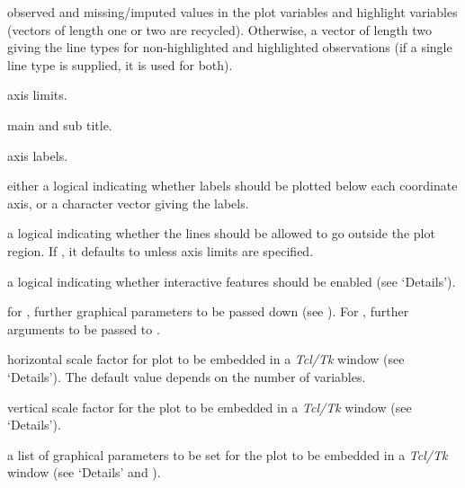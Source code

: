 \begin{Arguments}
\begin{ldescription}
observed and missing/imputed values in the plot variables and highlight variables 
(vectors of length one or two are recycled).  Otherwise, a vector of length 
two giving the line types for non-highlighted and highlighted observations 
(if a single line type is supplied, it is used for both).
\item[\code{xlim, ylim}] axis limits.
\item[\code{main, sub}] main and sub title.
\item[\code{xlab, ylab}] axis labels.
\item[\code{labels}] either a logical indicating whether labels should be plotted 
below each coordinate axis, or a character vector giving the labels.
\item[\code{xpd}] a logical indicating whether the lines should be allowed to go 
outside the plot region.  If , it defaults to  unless 
axis limits are specified.
\item[\code{interactive}] a logical indicating whether interactive features should 
be enabled (see `Details').
\item[\code{...}] for , further graphical parameters to be 
passed down (see ).  For , 
further arguments to be passed to .
\item[\code{hscale}] horizontal scale factor for plot to be embedded in a 
\emph{Tcl/Tk} window (see `Details').  The default value depends on 
the number of variables.
\item[\code{vscale}] vertical scale factor for the plot to be embedded in a 
\emph{Tcl/Tk} window (see `Details').
\item[\code{TKRpar}] a list of graphical parameters to be set for the plot to be 
embedded in a \emph{Tcl/Tk} window (see `Details' and 
).
\end{ldescription}
\end{Arguments}
%

